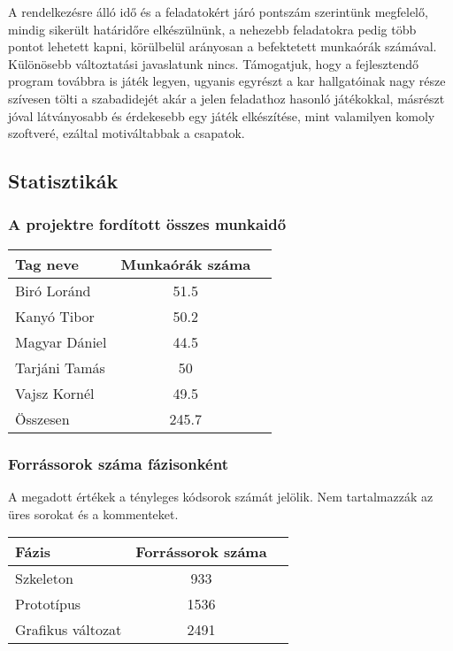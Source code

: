 A rendelkezésre álló idő és a feladatokért járó pontszám szerintünk megfelelő, mindig sikerült határidőre elkészülnünk, a nehezebb feladatokra pedig több pontot lehetett kapni, körülbelül arányosan a befektetett munkaórák számával. Különösebb változtatási javaslatunk nincs. Támogatjuk, hogy a fejlesztendő program továbbra is játék legyen, ugyanis egyrészt a kar hallgatóinak nagy része szívesen tölti a szabadidejét akár a jelen feladathoz hasonló játékokkal, másrészt jóval látványosabb és érdekesebb egy játék elkészítése, mint valamilyen komoly szoftveré, ezáltal motiváltabbak a csapatok.


\subsection{Statisztikák}

\subsubsection{A projektre fordított összes munkaidő}

\begin{tabular}{|p{130pt}|c|p{150pt}|}
\hline 
\textbf{Tag neve} & \textbf{Munkaórák száma}\\ 
\hline 
Biró Loránd & 51.5\\ 
\hline 
Kanyó Tibor & 50.2\\
\hline 
Magyar Dániel & 44.5\\
\hline 
Tarjáni Tamás & 50\\
\hline 
Vajsz Kornél & 49.5\\
\hline 
Összesen & 245.7\\
\hline
\end{tabular}

\newpage

\subsubsection{Forrássorok száma fázisonként}

A megadott értékek a tényleges kódsorok számát jelölik. Nem tartalmazzák az üres sorokat és a kommenteket. \\

\begin{tabular}{|p{130pt}|c|p{150pt}|}
\hline 
\textbf{Fázis} & \textbf{Forrássorok száma}\\ 
\hline 
Szkeleton & 933\\ 
\hline 
Prototípus & 1536\\
\hline 
Grafikus változat & 2491\\
\hline
\end{tabular}

